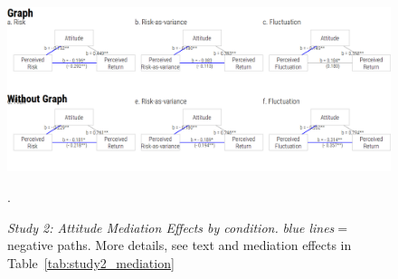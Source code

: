 \documentclass[a4paper,man, natbib,floatsintext]{apa6} %
\begin{document}
\begin{figure}[H]
    \centering
    \includegraphics{fig7}
    \caption{\textit{Study 2: Attitude Mediation Effects by condition.} \textit{blue lines}$=$negative paths. More details, see text and mediation effects in Table~\ref{tab:study2_mediation}}.
    \label{fig:study2_mediation_paths}
\end{figure}






\end{document}
